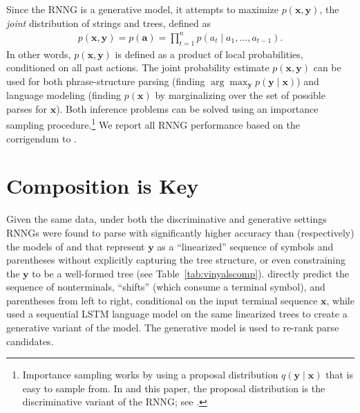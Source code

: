 \documentclass[11pt]{article}
\newcommand{\ignore}[1]{}
\newcommand{\nascomment}[1]{\textcolor{blue}{{\textbf{[#1 --\textsc{nas}]}}}}
\newcommand{\miguelcomment}[1]{\textcolor{red}{{\textbf{[#1 --\textsc{miguel}]}}}}
\renewcommand{\nascomment}[1]{}
\renewcommand{\miguelcomment}[1]{}
\begin{document}
Since the RNNG is a generative model, it attempts to maximize $p(\boldsymbol{x}, \boldsymbol{y})$, the \emph{joint} distribution of strings and trees, defined as
\begin{align*}
p(\boldsymbol{x}, \boldsymbol{y}) = p(\boldsymbol{a}) = \prod_{t=1}^{n} p(a_t \mid a_1,\ldots,a_{t-1}).
\end{align*}
In other words, $p(\boldsymbol{x}, \boldsymbol{y})$ is defined as a product of local probabilities, conditioned on all past actions. The joint probability estimate $p(\boldsymbol{x}, \boldsymbol{y})$ can be used for both phrase-structure parsing (finding $\arg\max_{\boldsymbol{y}} p(\boldsymbol{y} \mid \boldsymbol{x})$)  and language modeling (finding $p(\boldsymbol{x})$ by marginalizing over the set of possible parses for $\boldsymbol{x}$).  Both inference problems can be solved using an importance sampling procedure.\footnote{Importance sampling works by using a proposal distribution $q(\boldsymbol{y} \mid \boldsymbol{x})$ that is easy to sample from. In  and this paper, the proposal distribution is the discriminative variant of the RNNG; see .} We report all RNNG performance based on the corrigendum to .

\ignore{\miguelcomment{I think sect. 2 is too long, we have already published a paper with that info. If you want to do it like this, you should add some discussion about the things that you want to study/change in this paper... research questions,etc.}
\nascomment{disagree.  section 1 is way too long -- coming back to that later.  section 2 needs to make the paper self-contained since our contributions rely on digging into the model details}\miguelcomment{True. I "ignored" both comments}}

\section{Composition is Key}\label{sec:composition_analysis}

Given the same data, under both the discriminative and generative settings
 RNNGs were found to parse with significantly higher accuracy than (respectively) the models of  and  that represent $\boldsymbol{y}$ as a ``linearized'' sequence of symbols and parentheses without explicitly capturing the tree structure, or even constraining the $\boldsymbol{y}$ to be a well-formed tree (see Table~\ref{tab:vinyalscomp}).  directly predict the sequence of nonterminals, ``shifts'' (which consume a terminal symbol), and parentheses from left to right, conditional on the input terminal sequence $\boldsymbol{x}$, while  used a sequential LSTM language model on the same linearized trees to create a generative variant of the  model. The generative model is used to re-rank parse candidates.
\end{document}
